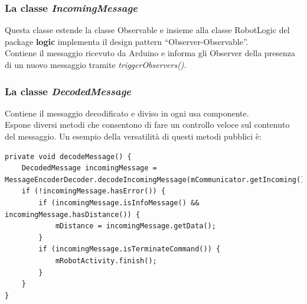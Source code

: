  \subsubsection{La classe \emph{IncomingMessage}}
 Questa classe estende la classe Observable e insieme alla classe RobotLogic del 
 package \textbf{logic} implementa il design pattern ``Observer-Observable''. 
 \\ Contiene il messaggio ricevuto da Arduino e informa gli Observer della presenza 
 di un nuovo messaggio tramite \emph{triggerObservers()}.

 \subsubsection{La classe \emph{DecodedMessage}}
 Contiene il messaggio decodificato e diviso in ogni usa componente.
 \\Espone diversi metodi che consentono di fare un controllo veloce sul contenuto del messaggio.
 Un esempio della versatilità di questi metodi pubblici è:  
 \lstset{language=Java}

\begin{lstlisting}[caption=Metodo \emph{decodeMessage()} di RobotLogic del 
pacchetto \textbf{logic}]
private void decodeMessage() {
    DecodedMessage incomingMessage = MessageEncoderDecoder.decodeIncomingMessage(mCommunicator.getIncoming());
    if (!incomingMessage.hasError()) {
        if (incomingMessage.isInfoMessage() && incomingMessage.hasDistance()) {
            mDistance = incomingMessage.getData();
        }
        if (incomingMessage.isTerminateCommand()) {
            mRobotActivity.finish();
        }
    }
}
\end{lstlisting}

